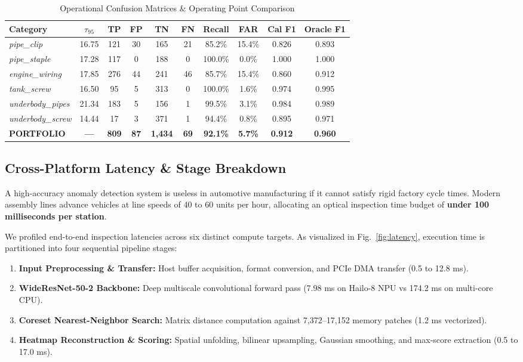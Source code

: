 \documentclass[journal,twocolumn]{IEEEtran}
\begin{document}
\begin{table}[t]
\caption{Operational Confusion Matrices \& Operating Point Comparison}
\label{tab:confusion_matrices}
\centering
\scriptsize
\begin{tabular}{lccccccccc}
\toprule
\textbf{Category} & $\tau_{95}$ & \textbf{TP} & \textbf{FP} & \textbf{TN} & \textbf{FN} & \textbf{Recall} & \textbf{FAR} & \textbf{Cal F1} & \textbf{Oracle F1} \\
\midrule
\textit{pipe\_clip} & 16.75 & 121 & 30 & 165 & 21 & 85.2\% & 15.4\% & 0.826 & 0.893 \\
\textit{pipe\_staple} & 17.28 & 117 & 0 & 188 & 0 & 100.0\% & 0.0\% & 1.000 & 1.000 \\
\textit{engine\_wiring} & 17.85 & 276 & 44 & 241 & 46 & 85.7\% & 15.4\% & 0.860 & 0.912 \\
\textit{tank\_screw} & 16.50 & 95 & 5 & 313 & 0 & 100.0\% & 1.6\% & 0.974 & 0.995 \\
\textit{underbody\_pipes} & 21.34 & 183 & 5 & 156 & 1 & 99.5\% & 3.1\% & 0.984 & 0.989 \\
\textit{underbody\_screw} & 14.44 & 17 & 3 & 371 & 1 & 94.4\% & 0.8\% & 0.895 & 0.971 \\
\midrule
\textbf{PORTFOLIO} & \textbf{---} & \textbf{809} & \textbf{87} & \textbf{1,434} & \textbf{69} & \textbf{92.1\%} & \textbf{5.7\%} & \textbf{0.912} & \textbf{0.960} \\
\bottomrule
\end{tabular}
\end{table}

\subsection{Cross-Platform Latency & Stage Breakdown}
A high-accuracy anomaly detection system is useless in automotive manufacturing if it cannot satisfy rigid factory cycle times. Modern assembly lines advance vehicles at line speeds of 40 to 60 units per hour, allocating an optical inspection time budget of \textbf{under 100 milliseconds per station}.

We profiled end-to-end inspection latencies across six distinct compute targets. As visualized in Fig.~\ref{fig:latency}, execution time is partitioned into four sequential pipeline stages:
\begin{enumerate}
    \item \textbf{Input Preprocessing \& Transfer:} Host buffer acquisition, format conversion, and PCIe DMA transfer (0.5 to 12.8 ms).
    \item \textbf{WideResNet-50-2 Backbone:} Deep multiscale convolutional forward pass (7.98 ms on Hailo-8 NPU vs 174.2 ms on multi-core CPU).
    \item \textbf{Coreset Nearest-Neighbor Search:} Matrix distance computation against 7,372--17,152 memory patches (1.2 ms vectorized).
    \item \textbf{Heatmap Reconstruction \& Scoring:} Spatial unfolding, bilinear upsampling, Gaussian smoothing, and max-score extraction (0.5 to 17.0 ms).
\end{enumerate}
\end{document}
